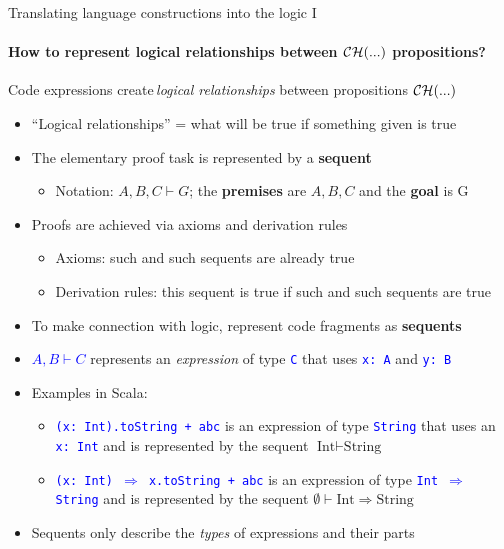 \documentclass[english]{beamer}
\begin{document}
\begin{frame}{Translating language constructions into the logic I}


\framesubtitle{How to represent logical relationships between ${\cal CH}(...)$
propositions?}

Code expressions create\,\emph{logical relationships} between propositions
${\cal CH}(...)$
\begin{itemize}
\item ``Logical relationships'' = what will be true if something given
is true
\item The elementary proof task is represented by a \textbf{sequent}
\begin{itemize}
\item Notation: $A,B,C\vdash G$; the \textbf{premises} are $A,B,C$ and
the \textbf{goal} is G
\end{itemize}
\item Proofs are achieved via axioms and derivation rules
\begin{itemize}
\item Axioms: such and such sequents are already true
\item Derivation rules: this sequent is true if such and such sequents are
true
\end{itemize}
\item To make connection with logic, represent code fragments as \textbf{sequents}
\item \textcolor{blue}{$A,B\vdash C$} represents an \emph{expression} of
type \texttt{\textcolor{blue}{\footnotesize{}C}} that uses \texttt{\textcolor{blue}{\footnotesize{}x:\ A}}
and \texttt{\textcolor{blue}{\footnotesize{}y:\ B}}{\footnotesize \par}
\item Examples in Scala:
\begin{itemize}
\item \texttt{\textcolor{blue}{\footnotesize{}(x:\ Int).toString + \textquotedbl{}abc\textquotedbl{}}}
is an expression of type \texttt{\textcolor{blue}{\footnotesize{}String}}
that uses an \texttt{\textcolor{blue}{\footnotesize{}x:\ Int}} and
is represented by the sequent $\text{Int}\vdash\text{String}$
\item \texttt{\textcolor{blue}{\footnotesize{}(x:\ Int) $\Rightarrow$
x.toString + \textquotedbl{}abc\textquotedbl{}}} is an expression
of type \texttt{\textcolor{blue}{\footnotesize{}Int $\Rightarrow$
String}} and is represented by the sequent $\emptyset\vdash\text{Int}\Rightarrow\text{String}$
\end{itemize}
\item Sequents only describe the \emph{types} of expressions and their parts
\end{itemize}
\end{frame}
\end{document}
